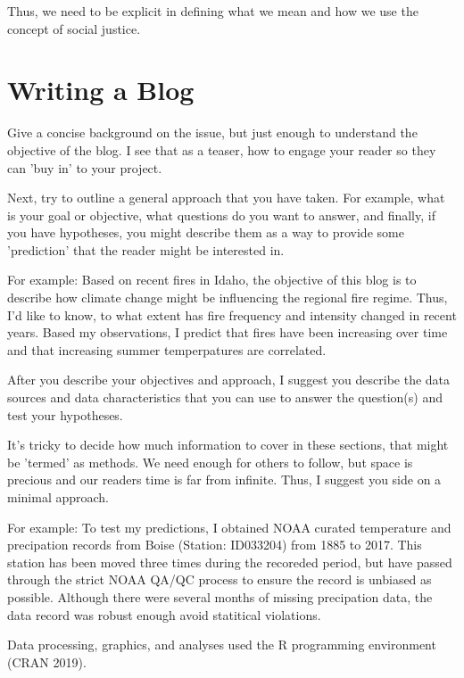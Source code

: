 \documentclass{tufte-handout}\usepackage[]{graphicx}\usepackage[]{color}
\begin{document}
Thus, we need to be explicit in defining what we mean and how we use the concept of social justice.

\section{Writing a Blog}

Give a concise background on the issue, but just enough to understand the objective of the blog. I see that as a teaser, how to engage your reader so they can 'buy in' to your project.

Next, try to outline a general approach that you have taken. For example, what is your goal or objective, what questions do you want to answer, and finally, if you have hypotheses, you might describe them as a way to provide some 'prediction' that the reader might be interested in. 

For example: Based on recent fires in Idaho, the objective of this blog is to describe how climate change might be influencing the regional fire regime. Thus, I'd like to know, to what extent has fire frequency and intensity changed in recent years. Based my observations, I predict that fires have been increasing over time and that increasing summer temperpatures are correlated. 

After you describe your objectives and approach, I suggest you describe the data sources and data characteristics that you can use to answer the question(s) and test your hypotheses.

It's tricky to decide how much information to cover in these sections, that might be 'termed' as methods. We need enough for others to follow, but space is precious and our readers time is far from infinite. Thus, I suggest you side on a minimal approach. 

For example: To test my predictions, I obtained NOAA curated temperature and precipation records from Boise (Station: ID033204) from 1885 to 2017. This station has been moved three times during the recoreded period, but have passed through the strict NOAA QA/QC process to ensure the record is unbiased as possible. Although there were several months of missing precipation data, the data record was robust enough avoid statitical violations. %

Data processing, graphics, and analyses used the R programming environment (CRAN 2019). 
\end{document}
